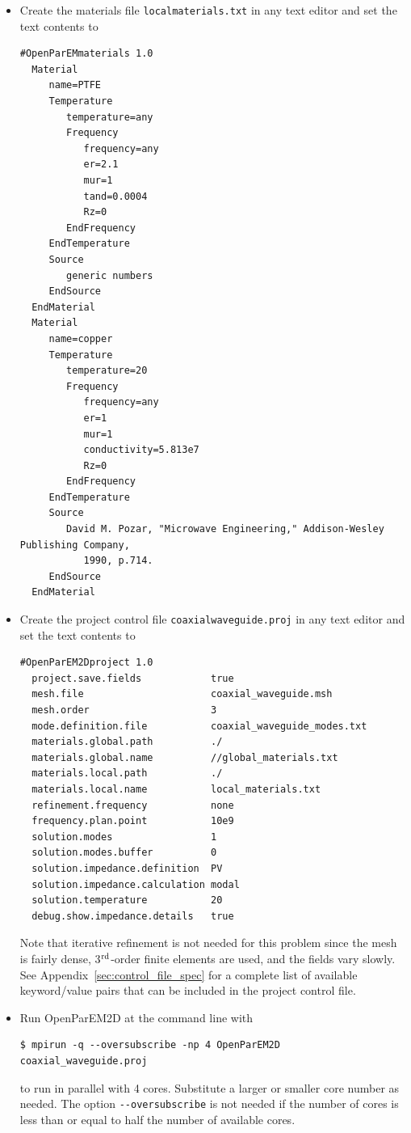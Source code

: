 \documentclass[titlepage]{article}
\renewcommand\_{\textunderscore\linebreak[1]}
\begin{document}
\begin{itemize}

\item Create the materials file \texttt{local\_materials.txt} in any text editor and set the text contents to
\begin{Verbatim}[fontsize=\small]
  #OpenParEMmaterials 1.0
  Material
     name=PTFE
     Temperature
        temperature=any
        Frequency
           frequency=any
           er=2.1
           mur=1
           tand=0.0004
           Rz=0
        EndFrequency
     EndTemperature
     Source
        generic numbers
     EndSource
  EndMaterial
  Material
     name=copper
     Temperature
        temperature=20
        Frequency
           frequency=any
           er=1
           mur=1
           conductivity=5.813e7
           Rz=0
        EndFrequency
     EndTemperature
     Source
        David M. Pozar, "Microwave Engineering," Addison-Wesley Publishing Company,
           1990, p.714.
     EndSource
  EndMaterial
\end{Verbatim}
\item Create the project control file \texttt{coaxial\_waveguide.proj} in any text editor and set the text contents to
\begin{Verbatim}[fontsize=\small]
  #OpenParEM2Dproject 1.0
  project.save.fields            true
  mesh.file                      coaxial_waveguide.msh
  mesh.order                     3
  mode.definition.file           coaxial_waveguide_modes.txt
  materials.global.path          ./
  materials.global.name          //global_materials.txt
  materials.local.path           ./
  materials.local.name           local_materials.txt
  refinement.frequency           none
  frequency.plan.point           10e9
  solution.modes                 1
  solution.modes.buffer          0
  solution.impedance.definition  PV
  solution.impedance.calculation modal
  solution.temperature           20
  debug.show.impedance.details   true
\end{Verbatim}

\noindent Note that iterative refinement is not needed for this problem since the mesh is fairly dense, 3$^{\textnormal{rd}}$-order finite elements are used, and the fields vary slowly.  See Appendix~\ref{sec:control_file_spec} for a complete list of available keyword/value pairs that can be included in the project control file.

\item Run OpenParEM2D at the command line with
\begin{Verbatim}[fontsize=\small]
   $ mpirun -q --oversubscribe -np 4 OpenParEM2D coaxial_waveguide.proj
\end{Verbatim}
to run in parallel with 4 cores.  Substitute a larger or smaller core number as needed.  The option \verb+--oversubscribe+ is not needed if the number of cores is less than or equal to half the number of available cores.
\end{itemize}
\end{document}

